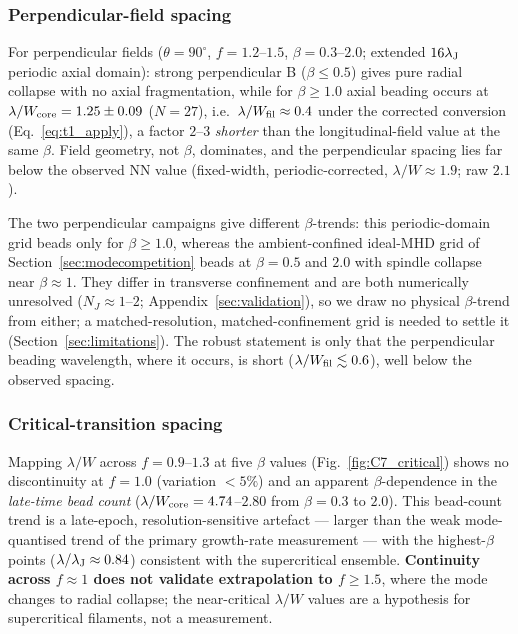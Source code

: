 \documentclass[usenatbib,twoside,twocolumn]{mnras}
\begin{document}
\subsubsection{Perpendicular-field spacing}

For perpendicular fields ($\theta=90^\circ$, $f=1.2$--$1.5$, $\beta=0.3$--$2.0$; extended $16\lambda_{\rm J}$ periodic axial domain): strong perpendicular B ($\beta\leq0.5$) gives pure radial collapse with no axial fragmentation, while for $\beta\geq1.0$ axial beading occurs at $\lambda/W_{\rm core}=1.25\pm0.09$ ($N=27$), i.e.\ $\lambda/W_{\rm fil}\approx0.4$ under the corrected conversion (Eq.~\ref{eq:t1_apply}), a factor $2$--$3$ \textit{shorter} than the longitudinal-field value at the same $\beta$. Field geometry, not $\beta$, dominates, and the perpendicular spacing lies far below the observed NN value (fixed-width, periodic-corrected, $\lambda/W\approx1.9$; raw $2.1$).

The two perpendicular campaigns give different $\beta$-trends: this periodic-domain grid beads only for $\beta\geq1.0$, whereas the ambient-confined ideal-MHD grid of Section~\ref{sec:modecompetition} beads at $\beta=0.5$ and $2.0$ with spindle collapse near $\beta\approx1$. They differ in transverse confinement and are both numerically unresolved ($N_J\approx1$--$2$; Appendix~\ref{sec:validation}), so we draw no physical $\beta$-trend from either; a matched-resolution, matched-confinement grid is needed to settle it (Section~\ref{sec:limitations}). The robust statement is only that the perpendicular beading wavelength, where it occurs, is short ($\lambda/W_{\rm fil}\lesssim0.6$), well below the observed spacing.

\subsubsection{Critical-transition spacing}

Mapping $\lambda/W$ across $f=0.9$--$1.3$ at five $\beta$ values (Fig.~\ref{fig:C7_critical}) shows no discontinuity at $f=1.0$ (variation $<5\%$) and an apparent $\beta$-dependence in the \emph{late-time bead count} ($\lambda/W_{\rm core}=4.74$--$2.80$ from $\beta=0.3$ to $2.0$). This bead-count trend is a late-epoch, resolution-sensitive artefact --- larger than the weak mode-quantised trend of the primary growth-rate measurement --- with the highest-$\beta$ points ($\lambda/\lambda_{\rm J}\approx0.84$) consistent with the supercritical ensemble. \textbf{Continuity across $f\approx1$ does not validate extrapolation to $f\geq1.5$}, where the mode changes to radial collapse; the near-critical $\lambda/W$ values are a hypothesis for supercritical filaments, not a measurement.
\end{document}
